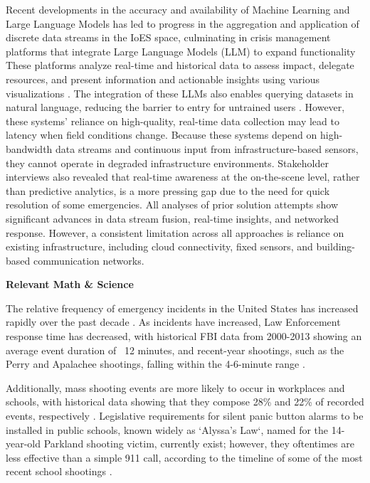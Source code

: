 \documentclass[english,12pt,a4paper,titlepage]{article}
\begin{document}
	Recent developments in the accuracy and availability of Machine Learning and Large Language Models has led to progress in the aggregation and application of discrete data streams in the IoES space, culminating in crisis management platforms that integrate Large Language Models (LLM) to expand functionality These platforms analyze real-time and historical data to assess impact, delegate resources, and present information and actionable insights using various visualizations \autocite{Ahmad2024}. The integration of these LLMs also enables querying datasets in natural language, reducing the barrier to entry for untrained users \autocite{Ahmad2024}. However, these systems' reliance on high-quality, real-time data collection may lead to latency when field conditions change. Because these systems depend on high-bandwidth data streams and continuous input from infrastructure-based sensors, they cannot operate in degraded infrastructure environments. Stakeholder interviews also revealed that real-time awareness at the on-the-scene level, rather than predictive analytics, is a more pressing gap due to the need for quick resolution of some emergencies.
	All analyses of prior solution attempts show significant advances in data stream fusion, real-time insights, and networked response. However, a consistent limitation across all approaches is reliance on existing infrastructure, including cloud connectivity, fixed sensors, and building-based communication networks.

	\label{Describe Phase - Relevant Math & Science}
	\begin{flushleft}
		\bfseries{Relevant Math \& Science}
	\end{flushleft}
	
	The relative frequency of emergency incidents in the United States has increased rapidly over the past decade \autocite{FBI2024}. As incidents have increased, Law Enforcement response time has decreased, with historical FBI data from 2000-2013 showing an average event duration of ~12 minutes, and recent-year shootings, such as the Perry and Apalachee shootings, falling within the 4-6-minute range \autocite{Tucker2024}.
	
	Additionally, mass shooting events are more likely to occur in workplaces and schools, with historical data showing that they compose 28\% and 22\% of recorded events, respectively \autocite{Rockefeller2025}. Legislative requirements for silent panic button alarms to be installed in public schools, known widely as `Alyssa's Law`, named for the 14-year-old Parkland shooting victim, currently exist; however, they oftentimes are less effective than a simple 911 call, according to the timeline of some of the most recent school shootings \autocite{Tucker2024}. 
	
\end{document}
